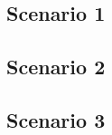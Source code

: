 \subsection{Scenario 1}
\label{sec:actuation_scn1}



\subsection{Scenario 2}
\label{sec:actuation_scn2}



\subsection{Scenario 3}
\label{sec:actuation_scn3}



